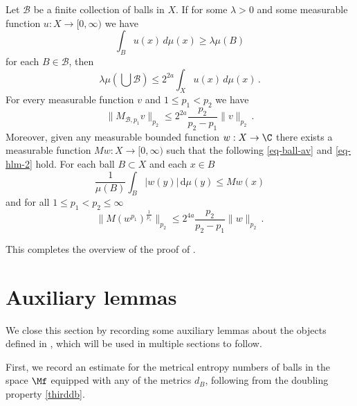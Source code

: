 \begin{proposition}
\label{Hardy-Littlewood}
\leanok
{}
   Let $\mathcal{B}$ be a finite collection of balls in $X$.
If for some $\lambda>0$ and some measurable function $u:X\to [0,\infty)$ we have
\begin{equation}\label{eq-ball-assumption}
\int_{B} u(x)\, d\mu(x)\ge \lambda \mu(B)
\end{equation}
for each $B\in \mathcal{B}$, then
\begin{equation}\label{eq-besico}
    \lambda \mu(\bigcup \mathcal{B}) \le 2^{2a}\int_X u(x)\, d\mu(x)\, .
\end{equation}
For every measurable function $v$
and $1\le p_1<p_2$ we have
\begin{equation}\label{eq-hlm}
    \|M_{\mathcal{B},p_1} v\|_{p_2}\le 2^{2a}\frac{p_2}{p_2-p_1} \|v\|_{p_2}\, .
\end{equation}
Moreover, given any measurable bounded function $w: X \to \C$ there exists a measurable function $Mw: X \to [0, \infty)$ such that the following \eqref{eq-ball-av} and \eqref{eq-hlm-2} hold. For each ball $B \subset X$ and each $x \in B$
\begin{equation}
    \label{eq-ball-av}
    \frac{1}{\mu(B)} \int_{B} |w(y)| \, \mathrm{d}\mu(y) \le Mw(x)
\end{equation}
and for all $1 \le p_1 < p_2 \le \infty$
\begin{equation}
    \label{eq-hlm-2}
    \|M(w^{p_1})^{\frac{1}{p_1}}\|_{p_2} \le 2^{4a} \frac{p_2}{p_2-p_1}\|w\|_{p_2}\,.
\end{equation}

\end{proposition}

This completes the overview of the proof of .

\section{Auxiliary lemmas}
\label{global-auxiliary-lemmas}
We close this section by recording some auxiliary lemmas about the objects defined in , which will be used in multiple sections to follow.

First, we record an estimate for the metrical entropy numbers of balls in the space $\Mf$ equipped with any of the metrics $d_B$, following from the doubling property \eqref{thirddb}.

